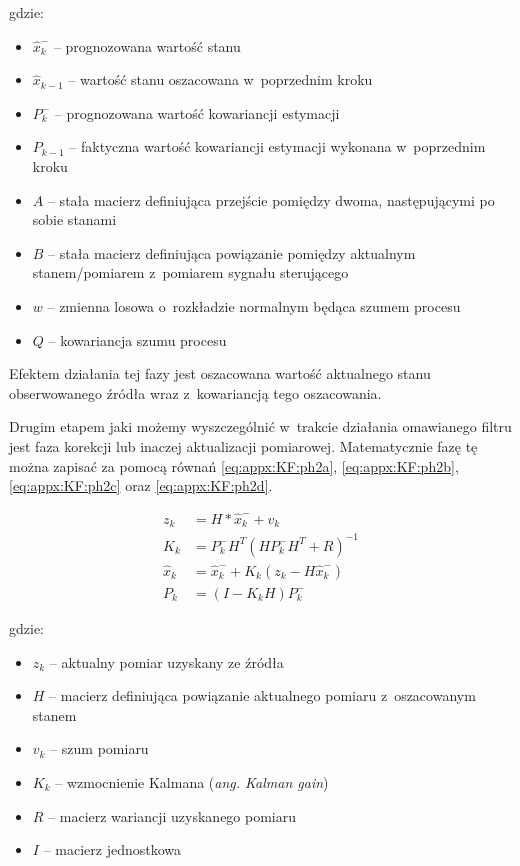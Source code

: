gdzie:
\begin{itemize}
	\item $\widehat{x}^-_k$ -- prognozowana wartość stanu
	\item $\widehat{x}_{k-1}$ -- wartość stanu oszacowana w~poprzednim kroku
	\item $P^-_k$ -- prognozowana wartość kowariancji estymacji
	\item $P_{k-1}$ -- faktyczna wartość kowariancji estymacji wykonana w~poprzednim kroku
	\item $A$ -- stała macierz definiująca przejście pomiędzy dwoma, następującymi po sobie stanami
	\item $B$ --  stała macierz definiująca powiązanie pomiędzy aktualnym stanem/pomiarem z~pomiarem sygnału sterującego
	\item $w$ --  zmienna losowa o~rozkładzie normalnym będąca szumem procesu
	\item $Q$ --  kowariancja szumu procesu
\end{itemize}

Efektem działania tej fazy jest oszacowana wartość aktualnego stanu obserwowanego źródła wraz z~kowariancją tego oszacowania.

Drugim etapem jaki możemy wyszczególnić w~trakcie działania omawianego filtru jest faza korekcji lub inaczej aktualizacji pomiarowej. Matematycznie fazę tę można zapisać za pomocą równań \eqref{eq:appx:KF:ph2a}, \eqref{eq:appx:KF:ph2b}, \eqref{eq:appx:KF:ph2c} oraz \eqref{eq:appx:KF:ph2d}.

\begin{subequations}
	\begin{align}
	z_k           & = H*\widehat{x}^-_k + v_k \label{eq:appx:KF:ph2a}                        \\
	K_k           & = P^-_{k}H^T(HP^-_{k}H^T + R)^{-1} \label{eq:appx:KF:ph2b}               \\
	\widehat{x}_k & = \widehat{x}^-_k + K_{k}(z_k-H\widehat{x}^-_k)  \label{eq:appx:KF:ph2c} \\
	P_k           & = (I-K_{k}H)P^-_k \label{eq:appx:KF:ph2d}                                
	\end{align}
\end{subequations}

gdzie:
\begin{itemize}
	\item $z_k$ -- aktualny pomiar uzyskany ze źródła
	\item $H$ -- macierz definiująca powiązanie aktualnego pomiaru z~oszacowanym stanem
	\item $v_k$ -- szum pomiaru
	\item $K_k$ -- wzmocnienie Kalmana (\emph{ang. Kalman gain})
	\item $R$ -- macierz wariancji uzyskanego pomiaru
	\item $I$ -- macierz jednostkowa
\end{itemize}

